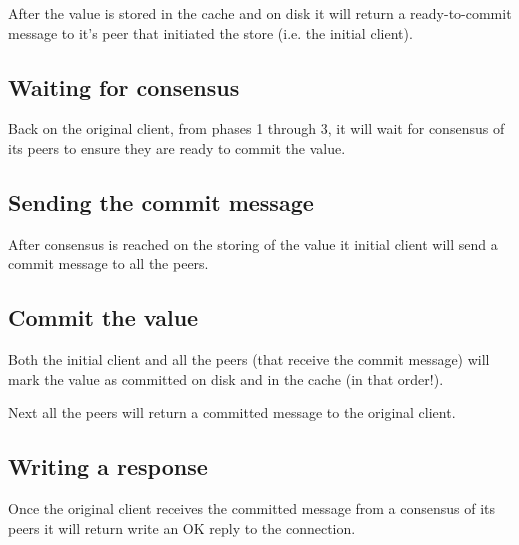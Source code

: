 \documentclass{scrartcl}
\begin{document}
After the value is stored in the cache and on disk it will return a
ready-to-commit message to it's peer that initiated the store (i.e. the initial
client).


\subsection{Waiting for consensus} \label{sec:storing_phase4}

Back on the original client, from phases 1 through 3, it will wait for consensus
of its peers to ensure they are ready to commit the value.


\subsection{Sending the commit message} \label{sec:storing_phase5}

After consensus is reached on the storing of the value it initial client will
send a commit message to all the peers.


\subsection{Commit the value} \label{sec:storing_phase6}

Both the initial client and all the peers (that receive the commit message) will
mark the value as committed on disk and in the cache (in that order!).

Next all the peers will return a committed message to the original client.


\subsection{Writing a response} \label{sec:storing_phase7}

Once the original client receives the committed message from a consensus of its
peers it will return write an OK reply to the connection.
\end{document}
